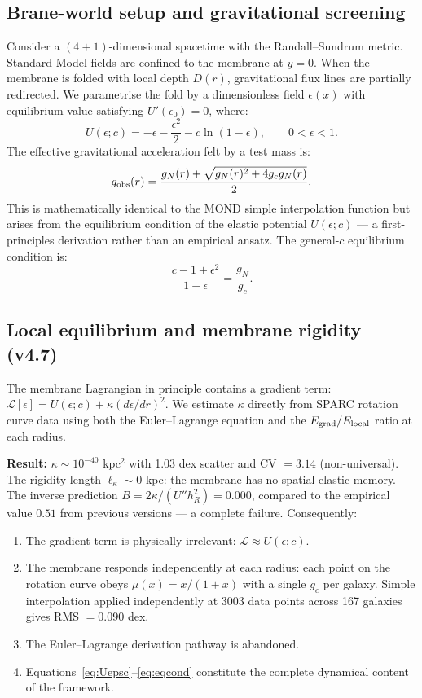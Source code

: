 \documentclass[11pt,a4paper]{article}
\newcommand{\gobs}{g_{\rm obs}}
\newcommand{\gN}{g_{N}}
\newcommand{\gc}{g_{c}}
\newcommand{\hR}{h_{R}}
\newcommand{\epso}{\epsilon_{0}}
\newcommand{\kap}{\kappa}
\begin{document}
\subsection{Brane-world setup and gravitational screening}
Consider a $(4+1)$-dimensional spacetime with the Randall--Sundrum metric. Standard Model fields are confined
to the membrane at $y=0$. When the membrane is folded with local depth $D(r)$, gravitational flux lines are
partially redirected. We parametrise the fold by a dimensionless field $\epsilon(x)$ with equilibrium value
satisfying $U'(\epso) = 0$, where:
\begin{equation}
U(\epsilon; c) = -\epsilon - \frac{\epsilon^2}{2} - c\ln(1 - \epsilon), \qquad 0 < \epsilon < 1.
\label{eq:Uepsc}
\end{equation}
The effective gravitational acceleration felt by a test mass is:
\begin{equation}
\gobs(r) = \frac{\gN(r) + \sqrt{\gN(r)^2 + 4\gc\gN(r)}}{2}.
\label{eq:gobs}
\end{equation}
This is mathematically identical to the MOND simple interpolation function but arises from the equilibrium
condition of the elastic potential $U(\epsilon;c)$ --- a first-principles derivation rather than an empirical
ansatz. The general-$c$ equilibrium condition is:
\begin{equation}
\frac{c - 1 + \epsilon^2}{1 - \epsilon} = \frac{\gN}{\gc}.
\label{eq:eqcond}
\end{equation}

\subsection{Local equilibrium and membrane rigidity (v4.7)}
The membrane Lagrangian in principle contains a gradient term:
$\mathcal{L}[\epsilon] = U(\epsilon;c) + \kap (d\epsilon/dr)^2$. We estimate $\kap$ directly from SPARC
rotation curve data using both the Euler--Lagrange equation and the $E_{\rm grad}/E_{\rm local}$ ratio at each
radius.

\textbf{Result:} $\kap \sim 10^{-40}$ kpc$^2$ with 1.03 dex scatter and CV $= 3.14$ (non-universal).
The rigidity length $\ell_\kap \sim 0$ kpc: the membrane has no spatial elastic memory. The inverse
prediction $B = 2\kap/(U'' \hR^2) = 0.000$, compared to the empirical value $0.51$ from previous versions
--- a complete failure. Consequently:
\begin{enumerate}[leftmargin=*,itemsep=2pt]
\item The gradient term is physically irrelevant: $\mathcal{L} \approx U(\epsilon; c)$.
\item The membrane responds independently at each radius: each point on the rotation curve obeys
$\mu(x) = x/(1+x)$ with a single $\gc$ per galaxy. Simple interpolation applied independently at 3003 data
points across 167 galaxies gives RMS $= 0.090$ dex.
\item The Euler--Lagrange derivation pathway is abandoned.
\item Equations~\eqref{eq:Uepsc}--\eqref{eq:eqcond} constitute the complete dynamical content of the framework.
\end{enumerate}
\end{document}
